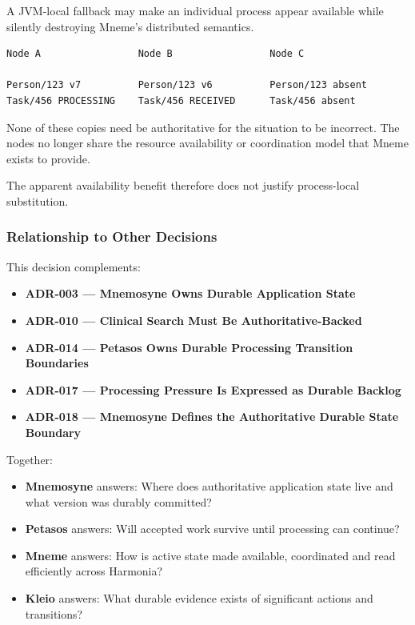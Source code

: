 A JVM-local fallback may make an individual process appear available while silently destroying Mneme's distributed semantics.

\begin{verbatim}
Node A                 Node B                 Node C

Person/123 v7          Person/123 v6          Person/123 absent
Task/456 PROCESSING    Task/456 RECEIVED      Task/456 absent
\end{verbatim}

None of these copies need be authoritative for the situation to be incorrect. The nodes no longer share the resource availability or coordination model that Mneme exists to provide.

The apparent availability benefit therefore does not justify process-local substitution.

\subsubsection{Relationship to Other Decisions}

This decision complements:
\begin{itemize}
    \item \textbf{ADR-003 --- Mnemosyne Owns Durable Application State}
    \item \textbf{ADR-010 --- Clinical Search Must Be Authoritative-Backed}
    \item \textbf{ADR-014 --- Petasos Owns Durable Processing Transition Boundaries}
    \item \textbf{ADR-017 --- Processing Pressure Is Expressed as Durable Backlog}
    \item \textbf{ADR-018 --- Mnemosyne Defines the Authoritative Durable State Boundary}
\end{itemize}

Together:
\begin{itemize}
    \item \textbf{Mnemosyne} answers: Where does authoritative application state live and what version was durably committed?
    \item \textbf{Petasos} answers: Will accepted work survive until processing can continue?
    \item \textbf{Mneme} answers: How is active state made available, coordinated and read efficiently across Harmonia?
    \item \textbf{Kleio} answers: What durable evidence exists of significant actions and transitions?
\end{itemize}

